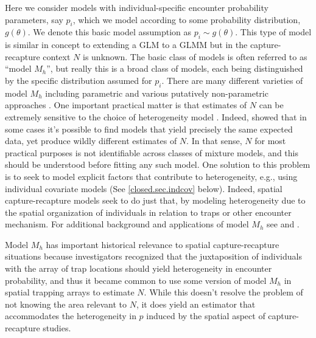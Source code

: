 Here we consider models with individual-specific encounter probability
parameters, say $p_{i}$, which we model according to some probability
distribution, $g(\theta)$. We denote this basic model assumption as
$p_{i} \sim g(\theta)$. This type of model is similar in concept to
extending a GLM to a GLMM but in the capture-recapture context $N$ is
unknown.  The basic class of models is often referred to as ``model
$M_h$'', but really this is a broad class of models, each being
distinguished by the specific distribution assumed for $p_{i}$.  There
are many different varieties of model $M_{h}$ including parametric and
various putatively non-parametric approaches
\citep{burnham_overton:1978, norris_pollock:1996, pledger:2000}. One
important practical matter is that estimates of $N$ can be extremely
sensitive to the choice of heterogeneity model
\citep{fienberg_etal:1999, dorazio_royle:2003, link:2003}. Indeed,
\citet{link:2003} showed that in some cases it's possible to find
models that yield precisely the same expected data, yet produce wildly
different estimates of $N$. In that sense, $N$ for most practical
purposes is not identifiable across classes of mixture models, and
this should be understood before fitting any such model. One solution
to this problem is to seek to model explicit factors that contribute
to heterogeneity, e.g., using individual covariate models (See
\ref{closed.sec.indcov} below). Indeed, spatial capture-recapture
models seek to do just that, by modeling heterogeneity due to the
spatial organization of individuals in relation to traps or other
encounter mechanism.  For additional background and applications of
model $M_{h}$ see \citet[][Chapt. 6]{royle_dorazio:2008} and
\citet[][Chapt. 6]{kery_schaub:2011}.

Model $M_{h}$ has important historical relevance to spatial
capture-recapture situations \citep{karanth:1995} because
investigators recognized that the juxtaposition of individuals with
the array of trap locations should yield heterogeneity in encounter
probability, and thus it became common to use some version of model $M_h$
in spatial trapping arrays to estimate $N$.  While this doesn't
resolve the problem of not knowing the area relevant to $N$, it does
yield an estimator that accommodates the heterogeneity in $p$ induced
by the spatial aspect of capture-recapture studies.

